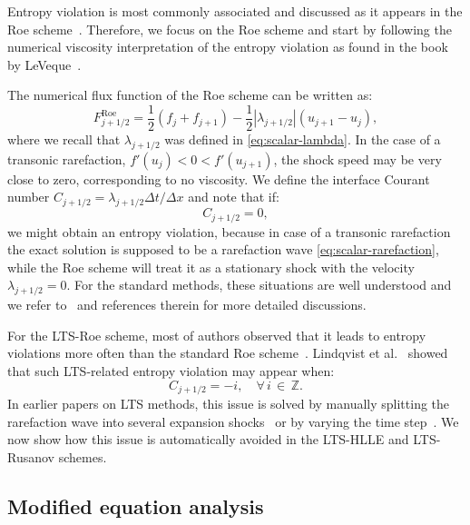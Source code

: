Entropy violation is most commonly associated and discussed as it appears in the Roe scheme~\cite{roe81}. Therefore, we focus on the Roe scheme and start by following the numerical viscosity interpretation of the entropy violation as found in the book by LeVeque~\cite{lev02}.

The numerical flux function of the Roe scheme can be written as:
\begin{equation}
F_{j+1/2}^\text{Roe} = \frac{1}{2} \left( f_j + f_{j+1} \right) - \frac{1}{2} \left| \lambda_{j+1/2} \right| \left( u_{j+1} - u_j \right),
\end{equation}
where we recall that $ \lambda_{j+1/2} $ was defined in \eqref{eq:scalar-lambda}. In the case of a transonic rarefaction, $ f'(u_j) < 0 < f'(u_{j+1}) $, the shock speed may be very close to zero, corresponding to no viscosity. We define the interface Courant number $ C_{j+1/2} = \lambda_{j+1/2} \Delta t / \Delta x $ and note that if:
\begin{equation} \label{eq:scalar-standard-EV}
C_{j+1/2} = 0,
\end{equation}
we might obtain an entropy violation, because in case of a transonic rarefaction the exact solution is supposed to be a rarefaction wave \eqref{eq:scalar-rarefaction}, while the Roe scheme will treat it as a stationary shock with the velocity $ \lambda_{j+1/2}=0 $. For the standard methods, these situations are well understood and we refer to~\cite{lev02} and references therein for more detailed discussions.

For the LTS-Roe scheme, most of authors observed that it leads to entropy violations more often than the standard Roe scheme~\cite{lev82,lev85,qia11,mor12a,xu14,lin16,lin16b}. Lindqvist et al.~\cite{lin16} showed that such LTS-related entropy violation may appear when:
\begin{equation} \label{eq:scalar-LTS-EV}
C_{j+1/2} = -i, \quad \forall \, i \, \in \, \mathbb{Z}.
\end{equation}
In earlier papers on LTS methods, this issue is solved by manually splitting the rarefaction wave into several expansion shocks~\cite{lev82,lev85,qia11,mor12a,xu14} or by varying the time step~\cite{lin16b,lin16}. We now show how this issue is automatically avoided in the LTS-HLLE and LTS-Rusanov schemes.

\subsection{Modified equation analysis}

